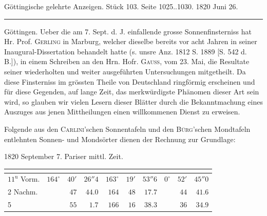 \clearpage
{}
\hypertarget{native-627-lower}{}
\begin{center}\small Göttingische gelehrte Anzeigen. Stück 103. Seite 1025..1030. 1820 Juni 26.\\[3pt]\rule{.72\linewidth}{.3pt}\end{center}

Göttingen. Ueber die am 7. Sept. d. J. einfallende grosse Sonnenfinsterniss hat Hr. Prof. \textsc{Gerling} in Marburg, welcher dieselbe bereits vor acht Jahren in seiner Inaugural-Dissertation behandelt hatte (s. unsre Anz. 1812 S. 1889 [S. 542 d. B.]), in einem Schreiben an den Hrn. Hofr. \textsc{Gauss}, vom 23. Mai, die Resultate seiner wiederholten und weiter ausgeführten Untersuchungen mitgetheilt. Da diese Finsterniss im grössten Theile von Deutschland ringförmig erscheinen und für diese Gegenden, auf lange Zeit, das merkwürdigste Phänomen dieser Art sein wird, so glauben wir vielen Lesern dieser Blätter  durch die Bekanntmachung eines Auszuges aus jenen Mittheilungen einen willkommenen Dienst zu erweisen.

Folgende aus den \textsc{Carlini}'schen Sonnentafeln und den \textsc{Bürg}'schen Mondtafeln entlehnten Sonnen- und Mondsörter dienen der Rechnung zur Grundlage:

1820 September 7. Pariser mittl. Zeit.

\begin{center}
\small\setlength{\tabcolsep}{2pt}\begin{tabular}{l|rrr|rrr|rrr}
 &  &  &  \\
\hline
$11^{\mathrm u}$ Vorm. & $164^\circ$ & $40'$ & $26''4$ & $163^\circ$ & $19'$ & $53''6$ & $0^\circ$ & $52'$ & $45''0$ \\
2 Nachm. & & $47$ & $44.0$ & $164$ & $48$ & $17.7$ & & $44$ & $41.6$ \\
5 & & $55$ & $1.7$ & $166$ & $16$ & $38.3$ & & $36$ & $34.9$ \\
\end{tabular}
\end{center}

